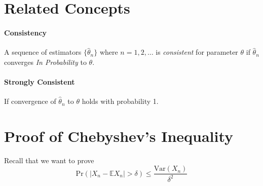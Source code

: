 \documentclass[a4paper,12pt]{scrartcl}
\begin{document}
\section{Related Concepts}

\paragraph{Consistency} A sequence of estimators $\{ \hat{\theta}_n \}$
where $n=1,2,\ldots$ is \emph{consistent} for parameter $\theta$ if
$\hat{\theta}_n$ converges \emph{In Probability} to $\theta$.

\paragraph{Strongly Consistent} If convergence of $\hat{\theta}_n$
to $\theta$ holds with probability 1.


\newpage
\appendix

\section{Proof of Chebyshev's Inequality}

Recall that we want to prove
\begin{equation}
    \text{Pr}\left(\left\lvert X_n - \mathbb{E}X_n \right\rvert > 
	\delta\right) \leq \frac{\text{Var}(X_n)}{\delta^2}
\end{equation}
\end{document}
